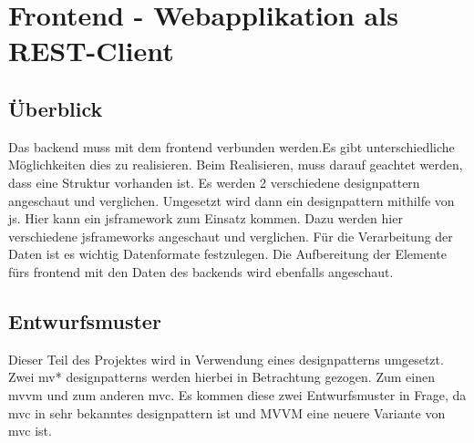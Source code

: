 \section{Frontend - Webapplikation als REST-Client}
\subsection{Überblick}
Das \Gls{backend} muss mit dem \Gls{frontend} verbunden werden.Es gibt unterschiedliche Möglichkeiten dies zu realisieren. Beim Realisieren, muss darauf geachtet werden, dass eine Struktur vorhanden ist. Es werden 2 verschiedene \Gls{designpattern} angeschaut und verglichen. Umgesetzt wird dann ein \Gls{designpattern} mithilfe von \Gls{js}. Hier kann ein \Gls{jsframework} zum Einsatz kommen. Dazu werden hier verschiedene \Gls{jsframework}s angeschaut und verglichen. Für die Verarbeitung der Daten ist es wichtig Datenformate festzulegen. Die Aufbereitung der Elemente fürs \Gls{frontend} mit den Daten des \Gls{backend}s wird ebenfalls angeschaut.
\subsection{Entwurfsmuster}
Dieser Teil des Projektes wird in Verwendung eines \Gls{designpattern}s umgesetzt. Zwei \Gls{mv*} \Gls{designpattern}s werden hierbei in Betrachtung gezogen. Zum einen \Gls{mvvm} und zum anderen \Gls{mvc}. Es kommen diese zwei Entwurfsmuster in Frage, da \Gls{mvc} in sehr bekanntes \Gls{designpattern} ist und MVVM eine neuere Variante von \Gls{mvc} ist.
